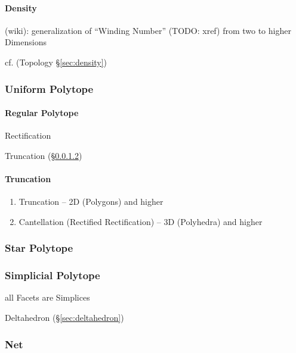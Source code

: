 \paragraph{Density}\label{sec:polytope_density}\hfill

(wiki): generalization of ``Winding Number'' (TODO: xref) from two to higher
Dimensions

cf.  (Topology \S\ref{sec:density})



\subsubsection{Uniform Polytope}\label{sec:uniform_polytope}

\paragraph{Regular Polytope}\label{sec:regular_polytope}\hfill

Rectification

Truncation (\S\ref{sec:truncation_operator})



\paragraph{Truncation}\label{sec:truncation_operator}\hfill

\begin{enumerate}
  \item Truncation -- 2D (Polygons) and higher
  \item Cantellation (Rectified Rectification) -- 3D (Polyhedra) and higher
\end{enumerate}



\subsubsection{Star Polytope}\label{sec:star_polytope}

\subsubsection{Simplicial Polytope}\label{sec:simplicial_polytope}

all Facets are Simplices

Deltahedron (\S\ref{sec:deltahedron})



\subsubsection{Net}\label{sec:polytope_net}

